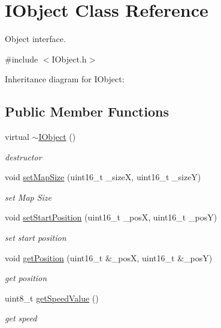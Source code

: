 \hypertarget{class_i_object}{\section{I\+Object Class Reference}
\label{class_i_object}
}


Object interface.  




{\ttfamily \#include $<$I\+Object.\+h$>$}



Inheritance diagram for I\+Object\+:
\subsection*{Public Member Functions}
\begin{DoxyCompactItemize}
\item 
virtual \hyperlink{class_i_object_a8833f77ebefa7e97e2acda58bb55966f}{$\sim$\+I\+Object} ()
\begin{DoxyCompactList}\small\item\em destructor \end{DoxyCompactList}\item 
void \hyperlink{class_i_object_a3b529c423de1e908c4c41be54efcaa4e}{set\+Map\+Size} (uint16\+\_\+t \+\_\+size\+X, uint16\+\_\+t \+\_\+size\+Y)
\begin{DoxyCompactList}\small\item\em set Map Size \end{DoxyCompactList}\item 
void \hyperlink{class_i_object_a4faf12f6148460b73aa4145cecafcf3e}{set\+Start\+Position} (uint16\+\_\+t \+\_\+pos\+X, uint16\+\_\+t \+\_\+pos\+Y)
\begin{DoxyCompactList}\small\item\em set start position \end{DoxyCompactList}\item 
void \hyperlink{class_i_object_a1507d6d4c007408b2f18745ed90517a6}{get\+Position} (uint16\+\_\+t \&\+\_\+pos\+X, uint16\+\_\+t \&\+\_\+pos\+Y)
\begin{DoxyCompactList}\small\item\em get position \end{DoxyCompactList}\item 
uint8\+\_\+t \hyperlink{class_i_object_ae5ced15bfc9793533c9592546942b8e3}{get\+Speed\+Value} ()
\begin{DoxyCompactList}\small\item\em get speed \end{DoxyCompactList}\item 

\end{DoxyCompactItemize}
